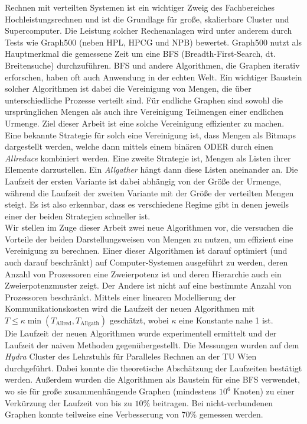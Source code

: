 \documentclass[final,oneside]{vutinfth}
\begin{document}
	
	\begin{kurzfassung}
		Rechnen mit verteilten Systemen ist ein wichtiger Zweig des Fachbereiches Hochleistungsrechnen und ist die Grundlage für große, skalierbare Cluster und Supercomputer. Die Leistung solcher Rechenanlagen wird unter anderem durch Tests wie Graph500 (neben HPL, HPCG und NPB) bewertet. Graph500 nutzt als Hauptmerkmal die gemessene Zeit um eine BFS (Breadth-First-Search, dt. Breitensuche) durchzuführen. BFS und andere Algorithmen, die Graphen iterativ erforschen, haben oft auch Anwendung in der echten Welt. Ein wichtiger Baustein solcher Algorithmen ist dabei die Vereinigung von Mengen, die über unterschiedliche Prozesse verteilt sind. Für endliche Graphen sind sowohl die ursprünglichen Mengen als auch ihre Vereinigung Teilmengen einer endlichen Urmenge. Ziel dieser Arbeit ist eine solche Vereinigung effizienter zu machen.\\
		Eine bekannte Strategie für solch eine Vereinigung ist, dass Mengen als Bitmaps dargestellt werden, welche dann mittels einem binären ODER durch einen \emph{Allreduce} kombiniert werden. Eine zweite Strategie ist, Mengen als Listen ihrer Elemente darzustellen. Ein  \emph{Allgather} hängt dann diese Listen aneinander an. Die Laufzeit der ersten Variante ist dabei abhängig von der Größe der Urmenge, während die Laufzeit der zweiten Variante mit der Größe der verteilten Mengen steigt. Es ist also erkennbar, dass es verschiedene Regime gibt in denen jeweils einer der beiden Strategien schneller ist.\\
		Wir stellen im Zuge dieser Arbeit zwei neue Algorithmen vor, die versuchen die Vorteile der beiden Darstellungsweisen von Mengen zu nutzen, um effizient eine Vereinigung zu berechnen. Einer dieser Algorithmen ist darauf optimiert (und auch darauf beschränkt) auf Computer-Systemen ausgeführt zu werden, deren Anzahl von Prozessoren eine Zweierpotenz ist und deren Hierarchie auch ein Zweierpotenzmuster zeigt. Der Andere ist nicht auf eine bestimmte Anzahl von Prozessoren beschränkt. Mittels einer linearen Modellierung der Kommunikationskosten wird die Laufzeit der neuen Algorithmen mit $T \leq \kappa \min(T_\mathrm{Allred}, T_\mathrm{Allgath})$ geschätzt, wobei $\kappa$ eine Konstante nahe 1 ist. \\
		Die Laufzeit der neuen Algorithmen wurde experimentell ermittelt und der Laufzeit der naiven Methoden gegenübergestellt. Die Messungen wurden auf dem \emph{Hydra} Cluster des Lehrstuhls für Paralleles Rechnen an der TU Wien durchgeführt. Dabei konnte die theoretische Abschätzung der Laufzeiten bestätigt werden. Außerdem wurden die Algorithmen als Baustein für eine BFS verwendet, wo sie für große zusammenhängende Graphen (mindestens $10^6$ Knoten) zu einer Verkürzung der Laufzeit von bis zu $10\%$ beitragen. Bei nicht-verbundenen Graphen konnte teilweise eine Verbesserung von 70\% gemessen werden.
		

\end{kurzfassung}
\end{document}
